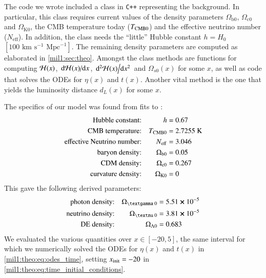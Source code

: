 

The code we wrote included a class in \verb|C++| representing the background. In particular, this class requires current values of the density parameters $\Omega_{\mathrm{b}0}$, $\Omega_{\mathrm{c}0}$ and $\Omega_{\mathrm{K}0}$, the CMB temperature today ($T_{\mathrm{CMB}0}$) and the effective neutrino number ($N_\mathrm{eff}$). In addition, the class needs the ``little'' Hubble constant $h=H_0$~$[100\text{~km}\text{~s}^{-1}\text{~Mpc}^{-1}]$. The remaining density parameters are computed as elaborated in \cref{mil1:sec:theo}. Amongst the class methods are functions for computing $\mathcal{H}(x)$, $\dv*{\mathcal{H}(x)}{x}$, $\dv*[2]{\mathcal{H}(x)}{x}$ and $\Omega_{s0}(x)$ for some $x$, as well as code that solves the ODEs for $\eta(x)$ and $t(x)$. Another vital method is the one that yields the luminosity distance $d_L(x)$ for some $x$.


The specifics of our model was found from fits to \citep{Planckdata}:
\begin{equation}\label{mil1:imp:eq:fiducials}
    \begin{split}
        \text{Hubble constant:}&& h &=0.67 \\
        \text{CMB temperature:}&& \TCMB &=2.7255\text{~K} \\
        \text{effective Neutrino number:}&& N\ped{eff}&=3.046\\
        \text{baryon density:}&& \Omega\ped{b 0}&=0.05\\
        \text{CDM density:}&& \Omega\ped{c 0}&=0.267\\
        \text{curvature density:}&& \OmgK&=0
    \end{split}
\end{equation}
This gave the following derived parameters:
\begin{equation}\label{mil1:imp:eq:derived_fiducials}
    \begin{split}
        \text{photon density:}&& \Omega\gped{\textgamma 0}&=5.51 \cross 10^{-5}\\
        \text{neutrino density:}&& \Omega\gped{\textnu 0}&=3.81 \cross 10^{-5}\\
        \text{DE density:}&& \OmgL&=0.683
    \end{split}
\end{equation}
We evaluated the various quantities over $x \in [-20, 5]$, the same interval for which we numerically solved the ODEs for $\eta(x)$ and $t(x)$ in \cref{mil1:theo:eq:odes_time}, setting $x_\mathrm{init}=-20$ in \cref{mil1:theo:eq:time_initial_conditions}. 

